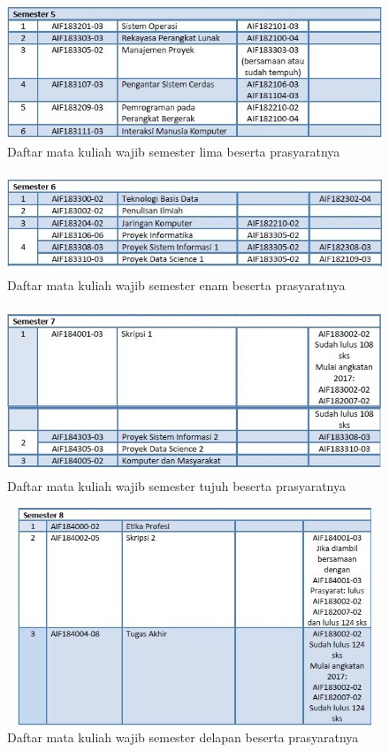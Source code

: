 \begin{figure}[H]
    \centering
    \includegraphics[width=12cm, height=4cm]{Gambar/Prasyarat MK Wajib Sem 5.jpg}
    \caption{Daftar mata kuliah wajib semester lima beserta prasyaratnya}
    \label{fig:gambarSem5}
\end{figure}

\begin{figure}[H]
    \centering
    \includegraphics[width=12cm, height=3cm]{Gambar/Prasyarat MK Wajib Sem 6.jpg}
    \caption{Daftar mata kuliah wajib semester enam beserta prasyaratnya}
    \label{fig:gambarSem6}
\end{figure}

\begin{figure}[H]
    \centering
    \includegraphics[width=13cm, height=5cm]{Gambar/Prasyarat MK Wajib Sem 7.jpg}
    \caption{Daftar mata kuliah wajib semester tujuh beserta prasyaratnya}
    \label{fig:gambarSem7}
\end{figure}

\begin{figure}[H]
    \centering
    \includegraphics[width=13cm, height=6.5cm]{Gambar/Prasyarat MK Wajib Sem 8.jpg}
    \caption{Daftar mata kuliah wajib semester delapan beserta prasyaratnya}
    \label{fig:gambarSem8}
\end{figure}




